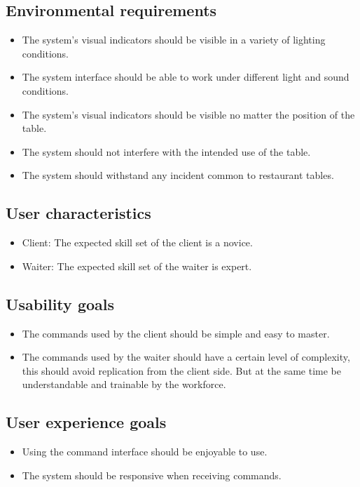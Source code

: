 \documentclass{article}
\begin{document}
\subsection{Environmental requirements}
\begin{itemize}
    \item The system's visual indicators should be visible in a variety of lighting conditions.
    \item The system interface should be able to work under different light and sound conditions.
    \item The system's visual indicators should be visible no matter the position of the table.
    \item The system should not interfere with the intended use of the table.
    \item The system should withstand any incident common to restaurant tables.
\end{itemize}
\subsection{User characteristics}
\begin{itemize}
    \item Client: The expected skill set of the client is a novice.
    \item Waiter: The expected skill set of the waiter is expert.
\end{itemize}
\subsection{Usability goals}
\begin{itemize}
    \item The commands used by the client should be simple and easy to master.
    \item The commands used by the waiter should have a certain level of complexity, this should avoid replication from the client side. But at the same time be understandable and trainable by the workforce.
\end{itemize}
\subsection{User experience goals}
\begin{itemize}
    \item Using the command interface should be enjoyable to use.
    \item The system should be responsive when receiving commands.
\end{itemize}
\end{document}

